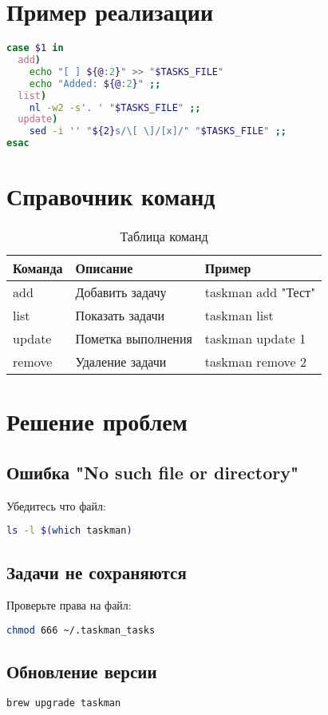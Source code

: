 \documentclass[a4paper,12pt]{article}
\begin{document}
\section{Пример реализации}
\begin{lstlisting}[language=bash, caption=Фрагмент скрипта taskman]
case $1 in
  add)
    echo "[ ] ${@:2}" >> "$TASKS_FILE"
    echo "Added: ${@:2}" ;;
  list)
    nl -w2 -s'. ' "$TASKS_FILE" ;;
  update)
    sed -i '' "${2}s/\[ \]/[x]/" "$TASKS_FILE" ;;
esac
\end{lstlisting}

\section{Справочник команд}
\begin{table}[h]
\centering
\begin{tabular}{|l|l|l|}
\hline
\textbf{Команда} & \textbf{Описание} & \textbf{Пример} \\
\hline
add & Добавить задачу & taskman add "Тест" \\
list & Показать задачи & taskman list \\
update & Пометка выполнения & taskman update 1 \\
remove & Удаление задачи & taskman remove 2 \\
\hline
\end{tabular}
\caption{Таблица команд}
\end{table}

\section{Решение проблем}
\subsection{Ошибка "No such file or directory"}
Убедитесь что файл:
\begin{lstlisting}[language=bash]
ls -l $(which taskman)
\end{lstlisting}

\subsection{Задачи не сохраняются}
Проверьте права на файл:
\begin{lstlisting}[language=bash]
chmod 666 ~/.taskman_tasks
\end{lstlisting}

\subsection{Обновление версии}
\begin{lstlisting}[language=bash]
brew upgrade taskman
\end{lstlisting}
\end{document}
